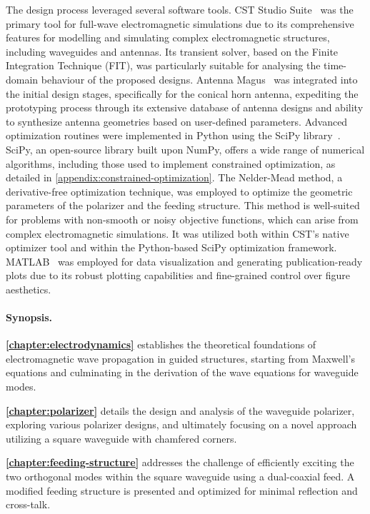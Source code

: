 \documentclass[11pt,a4paper,twoside,openany]{report}
\begin{document}
The design process leveraged several software tools. CST Studio Suite~\parencite{cst} was the primary tool for full-wave electromagnetic simulations due to its comprehensive features for modelling and simulating complex electromagnetic structures, including waveguides and antennas. Its transient solver, based on the Finite Integration Technique (FIT), was particularly suitable for analysing the time-domain behaviour of the proposed designs. Antenna Magus~\parencite{antenna-magus} was integrated into the initial design stages, specifically for the conical horn antenna, expediting the prototyping process through its extensive database of antenna designs and ability to synthesize antenna geometries based on user-defined parameters. Advanced optimization routines were implemented in Python using the SciPy library~\parencite{virtanen-et-al:scipy}. SciPy, an open-source library built upon NumPy, offers a wide range of numerical algorithms, including those used to implement constrained optimization, as detailed in \cref{appendix:constrained-optimization}. The Nelder-Mead method, a derivative-free optimization technique, was employed to optimize the geometric parameters of the polarizer and the feeding structure. This method is well-suited for problems with non-smooth or noisy objective functions, which can arise from complex electromagnetic simulations. It was utilized both within CST's native optimizer tool and within the Python-based SciPy optimization framework. MATLAB~\parencite{matlab} was employed for data visualization and generating publication-ready plots due to its robust plotting capabilities and fine-grained control over figure aesthetics.

\paragraph*{Synopsis.} \textbf{\cref{chapter:electrodynamics}} establishes the theoretical foundations of electromagnetic wave propagation in guided structures, starting from Maxwell's equations and culminating in the derivation of the wave equations for waveguide modes.

\textbf{\cref{chapter:polarizer}} details the design and analysis of the waveguide polarizer, exploring various polarizer designs, and ultimately focusing on a novel approach utilizing a square waveguide with chamfered corners.

\textbf{\cref{chapter:feeding-structure}} addresses the challenge of efficiently exciting the two orthogonal modes within the square waveguide using a dual-coaxial feed. A modified feeding structure is presented and optimized for minimal reflection and cross-talk.
\end{document}
